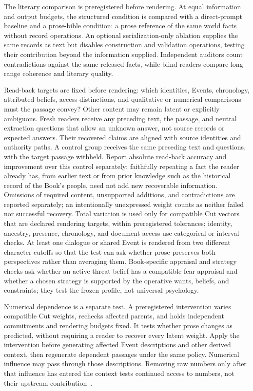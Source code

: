\documentclass[11pt,a4paper]{article}
\begin{document}
The literary comparison is preregistered before rendering. At equal information
and output budgets, the structured condition is compared with a direct-prompt
baseline and a prose-bible condition: a prose reference of the same world facts
without record operations. An optional serialization-only ablation supplies the same
records as text but disables construction and validation operations, testing
their contribution beyond the information supplied.
Independent auditors count contradictions against the same released facts,
while blind readers compare long-range coherence and literary quality.

Read-back targets are fixed before rendering: which identities, Events,
chronology, attributed beliefs, access distinctions, and qualitative or
numerical comparisons must the passage convey? Other content may remain latent
or explicitly ambiguous. Fresh readers receive any preceding text, the passage,
and neutral extraction questions that allow an unknown answer, not source
records or expected answers. Their recovered claims are aligned with source
identities and authority paths. A control group receives the same preceding
text and questions, with the target passage withheld.
Report absolute read-back accuracy and improvement over this control separately:
faithfully repeating a fact the reader already has, from earlier text or from
prior knowledge such as the historical record of the Book's people, need not
add new recoverable information.
Omissions of
required content, unsupported additions, and contradictions are reported separately;
an intentionally unexpressed weight counts as neither failed nor successful
recovery. Total variation is used only for compatible Cut vectors that are
declared rendering targets, within preregistered tolerances; identity, ancestry,
presence, chronology, and document access use categorical or interval checks.
At least one dialogue or shared Event is
rendered from two different character cutoffs so that the test can ask whether
prose preserves both perspectives rather than averaging them. Book-specific appraisal and strategy
checks ask whether an active threat belief has a compatible fear appraisal and
whether a chosen strategy is supported by the operative wants, beliefs, and
constraints; they test the frozen profile, not universal psychology.

Numerical dependence is a separate test. A preregistered intervention varies
compatible Cut weights, rechecks affected parents, and holds independent
commitments and rendering budgets fixed. It tests whether prose changes as
predicted, without requiring a reader to recover every latent weight.
Apply the intervention before
generating affected Event descriptions and other derived context, then
regenerate dependent passages under the same policy. Numerical influence may
pass through those descriptions. Removing raw numbers only after that influence
has entered the context tests continued access to numbers, not their upstream
contribution~\cite{westerbergLifeSimulation2026}.
\end{document}
